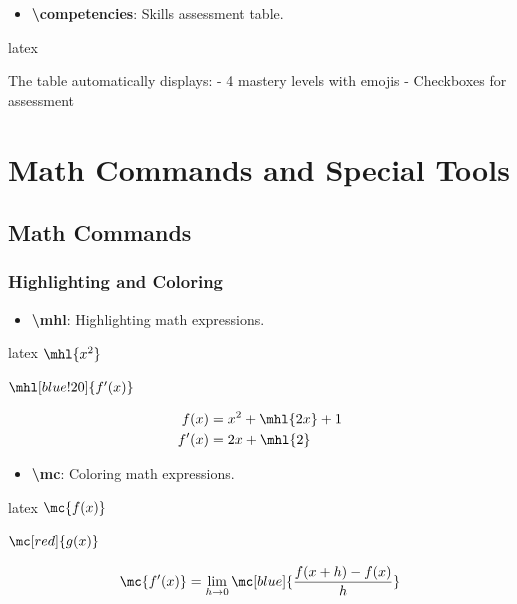 \documentclass[
    margin=2cm
]{neoschool}
\begin{document}
\begin{itemize}
\item
  \textbf{\textbackslash competencies}: Skills assessment table.
\end{itemize}

\begin{code}{latex}
\end{code}

The table automatically displays: - 4 mastery levels with emojis -
Checkboxes for assessment

\section{Math Commands and Special
Tools}

\subsection{Math Commands}

\subsubsection{Highlighting and Coloring}

\begin{itemize}
\item
  \textbf{\textbackslash mhl}: Highlighting math expressions.
\end{itemize}

\begin{code}{latex}
$\mhl{x^2}$

$\mhl[blue!20]{f'(x)}$

\begin{align*}
    f(x) &= x^2 + \mhl{2x} + 1 \\
    f'(x) &= 2x + \mhl{2}
\end{align*}
\end{code}

\begin{itemize}
\item
  \textbf{\textbackslash mc}: Coloring math expressions.
\end{itemize}

\begin{code}{latex}
$\mc{f(x)}$

$\mc[red]{g(x)}$

\[ \mc{f'(x)} = \lim_{h \to 0} \mc[blue]{\frac{f(x+h)-f(x)}{h}} \]
\end{code}
\end{document}
